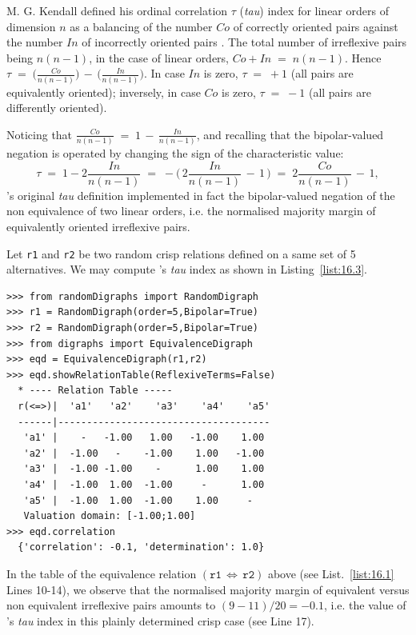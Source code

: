 M. G. Kendall defined his ordinal correlation $\tau$ (\emph{tau}) index for linear orders of dimension $n$ as a balancing of the number $Co$ of correctly oriented pairs against the number $In$ of incorrectly oriented pairs \citep{KEN-1938}. The total number of irreflexive pairs being $n(n-1)$, in the case of linear orders, $Co + In \;=\; n(n-1)$.  Hence $\tau \;=\; \big(\frac{Co}{n(n-1)}\big) \,-\, \big(\frac{In}{n(n-1)}\big)$. In case $In$ is zero, $\tau \;=\; +1$  (all pairs are equivalently oriented); inversely, in case $Co$ is zero, $\tau \;=\; -1$ (all pairs are differently oriented).

Noticing that $\frac{Co}{n(n-1)} \;=\; 1 \,-\, \frac{In}{n(n-1)}$, and recalling that the bipolar-valued negation is operated by changing the sign of the characteristic value:
\begin{equation}
      \tau \;=\; 1 -2\frac{In}{n(n-1)} \;=\; -\big(\,2\frac{In}{n(n-1)} \,-\, 1\,\big) \;=\; 2\frac{Co}{n(n-1)} \,-\, 1,
\end{equation} 
\Kendall 's original \emph{tau} definition implemented in fact the bipolar-valued negation of the non equivalence of two linear orders, i.e. the normalised majority margin of equivalently oriented irreflexive pairs.

Let \texttt{r1} and \texttt{r2} be two random crisp relations defined on a same set of 5 alternatives. We may compute \Kendall 's \emph{tau} index as shown in Listing~\vref{list:16.3}.
\begin{lstlisting}[caption={Computing a relational equivalence digraph},label=list:16.3]
>>> from randomDigraphs import RandomDigraph
>>> r1 = RandomDigraph(order=5,Bipolar=True)
>>> r2 = RandomDigraph(order=5,Bipolar=True)
>>> from digraphs import EquivalenceDigraph
>>> eqd = EquivalenceDigraph(r1,r2)
>>> eqd.showRelationTable(ReflexiveTerms=False)
  * ---- Relation Table -----
  r(<=>)|  'a1'	  'a2'	  'a3'	  'a4'	  'a5'	  
  ------|-------------------------------------
   'a1' |    -   -1.00   1.00   -1.00    1.00	 
   'a2' |  -1.00   -    -1.00    1.00   -1.00	 
   'a3' |  -1.00 -1.00    -      1.00    1.00	 
   'a4' |  -1.00  1.00  -1.00     -      1.00	 
   'a5' |  -1.00  1.00  -1.00    1.00     - 	 
   Valuation domain: [-1.00;1.00]
>>> eqd.correlation
  {'correlation': -0.1, 'determination': 1.0}
\end{lstlisting}
In the table of the equivalence relation $(\mathtt{r1}\, \Leftrightarrow\, \mathtt{r2})$ above (see List.~\vref{list:16.1} Lines 10-14), we observe that the normalised majority margin of equivalent versus non equivalent irreflexive pairs amounts to $(9 - 11)/20 = -0.1$, i.e. the value of \Kendall 's \emph{tau} index in this plainly determined crisp case (see Line 17).

